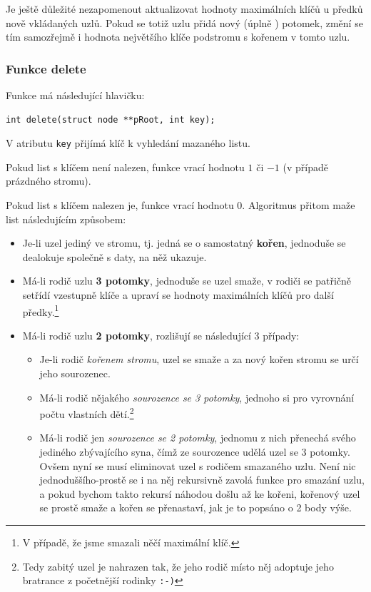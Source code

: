 \documentclass[11pt,a4paper]{article}
\begin{document}
Je ještě důležité nezapomenout aktualizovat hodnoty maximálních klíčů u předků
nově vkládaných uzlů.
Pokud se totiž uzlu přidá nový (úplně ) potomek, změní se tím
samozřejmě i hodnota největšího klíče podstromu s kořenem v tomto uzlu.

\subsubsection{Funkce delete}

Funkce má následující hlavičku:

\begin{verbatim}
int delete(struct node **pRoot, int key);
\end{verbatim}

V atributu \verb~key~ přijímá klíč k vyhledání mazaného listu.

Pokud list s klíčem není nalezen, funkce vrací hodnotu $1$ či $-1$ (v případě
prázdného stromu).

Pokud list s klíčem nalezen je, funkce vrací hodnotu $0$.
Algoritmus přitom maže list následujícím způsobem:

\renewcommand{\labelitemi}{$\Theta$}
\begin{itemize}
\item Je-li uzel jediný ve stromu, tj. jedná se o samostatný \textbf{kořen},
jednoduše se dealokuje společně s daty, na něž ukazuje.
\item Má-li rodič uzlu \textbf{3 potomky}, jednoduše se uzel smaže, v rodiči
se patřičně setřídí vzestupně klíče a upraví se hodnoty maximálních klíčů pro
další předky.\footnote{V případě, že jsme smazali něčí maximální klíč.}
\item Má-li rodič uzlu \textbf{2 potomky}, rozlišují se následující 3 případy:

  \renewcommand{\labelitemii}{$\Upsilon$}
  \begin{itemize}
  \item Je-li rodič \textit{kořenem stromu}, uzel se smaže a za nový kořen
  stromu se určí jeho sourozenec.
  \item Má-li rodič nějakého \textit{sourozence se 3 potomky}, jednoho si
   pro vyrovnání počtu vlastních dětí.\footnote{Tedy zabitý uzel je
  nahrazen tak, že jeho rodič místo něj adoptuje jeho bratrance z početnější
  rodinky {\tt :-)}}
  \item Má-li rodič jen \textit{sourozence se 2 potomky}, jednomu z nich
  přenechá svého jediného zbývajícího syna, čímž ze sourozence udělá uzel se 3
  potomky.
  Ovšem nyní se musí eliminovat uzel s rodičem smazaného uzlu.
  Není nic jednoduššího-prostě se i na něj rekursivně zavolá funkce pro smazání
  uzlu, a pokud bychom takto rekursí náhodou došlu až ke kořeni, kořenový uzel
  se prostě smaže a kořen se přenastaví, jak je to popsáno o 2 body výše.
  \end{itemize}

\end{itemize}
\end{document}
